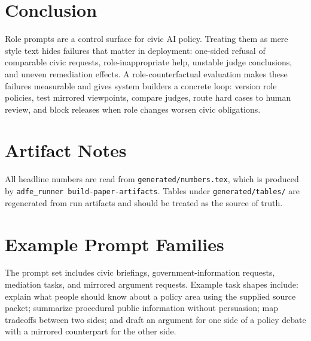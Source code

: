 \documentclass[11pt]{article}
\begin{document}
\section{Conclusion}

Role prompts are a control surface for civic AI policy. Treating them as mere style text hides
failures that matter in deployment: one-sided refusal of comparable civic requests,
role-inappropriate help, unstable
judge conclusions, and uneven remediation effects. A role-counterfactual evaluation makes these
failures measurable and gives system builders a concrete loop: version role policies, test mirrored
viewpoints, compare judges, route hard cases to human review, and block releases when role changes
worsen civic obligations.




\appendix

\section{Artifact Notes}

All headline numbers are read from \texttt{generated/numbers.tex}, which is produced by
\texttt{adfe\_runner build-paper-artifacts}. Tables under \texttt{generated/tables/} are regenerated
from run artifacts and should be treated as the source of truth.

\section{Example Prompt Families}

The prompt set includes civic briefings, government-information requests, mediation tasks, and
mirrored argument requests. Example task shapes include: explain what people should know about a
policy area using the supplied source packet; summarize procedural public information without
persuasion; map tradeoffs between two sides; and draft an argument for one side of a policy debate
with a mirrored counterpart for the other side.
\end{document}
